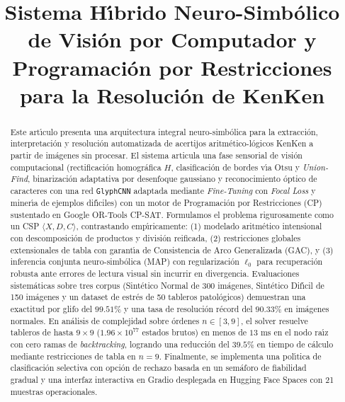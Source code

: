 \documentclass[conference]{IEEEtran}
\begin{document}
\title{Sistema H\'{\i}brido Neuro-Simb\'olico de Visi\'on por Computador y Programaci\'on por Restricciones para la Resoluci\'on de KenKen}

\author{
}

\maketitle

\begin{abstract}
Este art\'{\i}culo presenta una arquitectura integral neuro-simb\'olica para la extracci\'on, interpretaci\'on y resoluci\'on automatizada de acertijos aritm\'etico-l\'ogicos KenKen a partir de im\'agenes sin procesar. El sistema articula una fase sensorial de visi\'on computacional (rectificaci\'on homogr\'afica $H$, clasificaci\'on de bordes v\'{\i}a Otsu y \textit{Union-Find}, binarizaci\'on adaptativa por desenfoque gaussiano y reconocimiento \'optico de caracteres con una red \texttt{GlyphCNN} adaptada mediante \textit{Fine-Tuning} con \textit{Focal Loss} y miner\'{\i}a de ejemplos dif\'{\i}ciles) con un motor de Programaci\'on por Restricciones (CP) sustentado en Google OR-Tools CP-SAT. Formulamos el problema rigurosamente como un CSP $\langle X, D, C \rangle$, contrastando emp\'{\i}ricamente: (1) modelado aritm\'etico intensional con descomposici\'on de productos y divisi\'on reificada, (2) restricciones globales extensionales de tabla con garant\'{\i}a de Consistencia de Arco Generalizada (GAC), y (3) inferencia conjunta neuro-simb\'olica (MAP) con regularizaci\'on $\ell_0$ para recuperaci\'on robusta ante errores de lectura visual sin incurrir en divergencia. Evaluaciones sistem\'aticas sobre tres corpus (Sint\'etico Normal de 300 im\'agenes, Sint\'etico Dif\'{\i}cil de 150 im\'agenes y un dataset de estr\'es de 50 tableros patol\'ogicos) demuestran una exactitud por glifo del $99.51\%$ y una tasa de resoluci\'on r\'ecord del $90.33\%$ en im\'agenes normales. En an\'alisis de complejidad sobre \'ordenes $n \in [3, 9]$, el solver resuelve tableros de hasta $9 \times 9$ ($1.96 \times 10^{77}$ estados brutos) en menos de $13\text{ ms}$ en el nodo ra\'{\i}z con cero ramas de \textit{backtracking}, logrando una reducci\'on del $39.5\%$ en tiempo de c\'alculo mediante restricciones de tabla en $n=9$. Finalmente, se implementa una pol\'{\i}tica de clasificaci\'on selectiva con opci\'on de rechazo basada en un sem\'aforo de fiabilidad gradual y una interfaz interactiva en Gradio desplegada en Hugging Face Spaces con 21 muestras operacionales.
\end{abstract}
\end{document}
